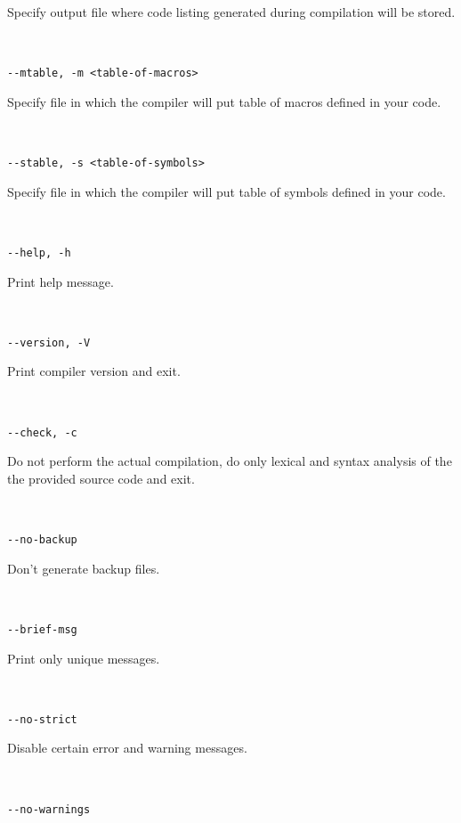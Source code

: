             Specify output file where code listing generated during compilation will be stored.
            {
            ~\\
            \usecodefont
            
            \verb'--mtable, -m <table-of-macros>'\\
            }
            Specify file in which the compiler will put table of macros defined in your code.
            {
            ~\\
            \usecodefont
            
            \verb'--stable, -s <table-of-symbols>'\\
            }
            Specify file in which the compiler will put table of symbols defined in your code.
            {
            ~\\
            \usecodefont
            
            \verb'--help, -h'\\
            }
            Print help message.
             {
            ~\\
            \usecodefont
            
            \verb'--version, -V'\\
            }
            Print compiler version and exit.
             {
            ~\\
            \usecodefont
            
            \verb'--check, -c'\\
            }
            Do not perform the actual compilation, do only lexical and syntax analysis of the the provided source code and exit.
             {
            ~\\
            \usecodefont
            
            \verb'--no-backup'\\
            }
            Don't generate backup files.\\
             {
            ~\\
            \usecodefont
            
            \verb'--brief-msg'\\
            }
            Print only unique messages.
             {
            ~\\
            \usecodefont
            
            \verb'--no-strict'\\
            }
            Disable certain error and warning messages.
             {
            ~\\
            \usecodefont
            
            \verb'--no-warnings'\\
            }

